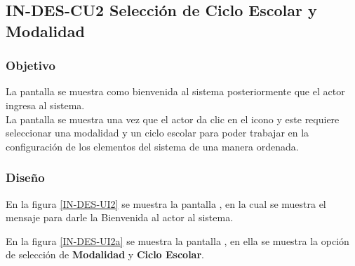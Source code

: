 \subsection{IN-DES-CU2 Selección de Ciclo Escolar y Modalidad}

\subsubsection{Objetivo}
	
	La pantalla  se muestra como bienvenida al sistema posteriormente que el actor ingresa al sistema.\\
	
	
	La pantalla   se muestra una vez que el actor da clic en el icono \IUEditar y este requiere seleccionar una modalidad y un ciclo escolar para poder trabajar en la configuración de los elementos del sistema de una manera ordenada.

\subsubsection{Diseño}


   

    En la figura \ref{IN-DES-UI2} se muestra la pantalla , en la cual se muestra el mensaje  para darle la Bienvenida al actor al sistema.
    
      En la figura \ref{IN-DES-UI2a} se muestra la pantalla , en ella se muestra la opción de selección de \textbf{Modalidad} y \textbf{Ciclo Escolar}.
    
   
    
    
